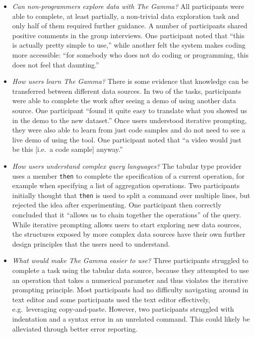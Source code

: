 \documentclass[fleqn,11pt]{report}
\theoremstyle{definition}
\newenvironment{nitemize}
{ \vspace{-0.4em}
  \begin{itemize}
    \setlength{\itemsep}{5pt}
    \setlength{\parskip}{0pt}
    \setlength{\parsep}{0pt} }
{ \end{itemize}
  \vspace{-0.4em} }
\begin{document}
\begin{nitemize}
\item \emph{Can non-programmers explore data with The Gamma?}
All participants were able to complete, at least partially, a non-trivial data exploration task and
only half of them required further guidance. A number of participants shared positive comments in
the group interviews. One participant noted that ``this is actually pretty simple to use,''
while another felt the system makes coding more accessible:
``for somebody who does not do coding or programming, this does not feel that daunting.''

\item \emph{How users learn The Gamma?}
There is some evidence that knowledge can be transferred between different data sources. In two
of the tasks, participants were able to complete the work after seeing a demo
of using another data source. One participant ``found it quite easy to translate what you showed
us in the demo to the new dataset.'' Once users understood iterative prompting, they were also
able to learn from just code samples and do not need to see a live demo of using the tool.
One participant noted that ``a video would just be this [i.e.~a code sample] anyway.''

\item \emph{How users understand complex query languages?}
The tabular type provider uses a member \texttt{then} to complete the specification of a
current operation, for example when specifying a list of aggregation operations. Two participants
initially thought that \texttt{then} is used to split a command over multiple lines,
but rejected the idea after experimenting. One participant then correctly concluded that it
``allows us to chain together the operations'' of the query. While iterative prompting
allows users to start exploring new data sources, the structures exposed by more complex data
sources have their own further design principles that the users need to understand.

\item \emph{What would make The Gamma easier to use?}
Three participants struggled to complete a task using the tabular data source,
because they attempted to use an operation that takes a numerical parameter and thus
violates the iterative prompting principle. Most participants had no difficulty navigating
around in text editor and some participants used the text editor effectively, e.g.~leveraging
copy-and-paste. However, two participants struggled with indentation and a syntax error in an
unrelated command. This could likely be alleviated through better error reporting.
\end{nitemize}
\end{document}
